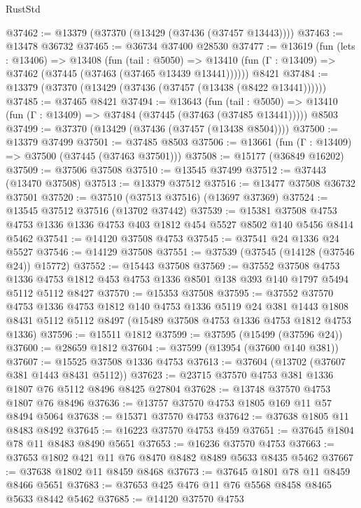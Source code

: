 \begin{lexlean}{RustStd}
\begin{coremodule}
@37462 := @13379 (@37370 (@13429 (@37436 (@37457 @13443))))
@37463 := @13478 @36732
@37465 := @36734 @37400 @28530
@37477 := @13619
    (fun (lets : @13406) =>
    @13408
      (fun (tail : @5050) =>
      @13410 (fun (Γ : @13409) => @37462 (@37445 (@37463 (@37465 @13439 @13441))))))
    @8421
@37484 := @13379 (@37370 (@13429 (@37436 (@37457 (@13438 (@8422 @13441))))))
@37485 := @37465 @8421
@37494 := @13643
    (fun (tail : @5050) => @13410 (fun (Γ : @13409) => @37484 (@37445 (@37463 (@37485 @13441)))))
    @8503
@37499 := @37370 (@13429 (@37436 (@37457 (@13438 @8504))))
@37500 := @13379 @37499
@37501 := @37485 @8503
@37506 := @13661 (fun (Γ : @13409) => @37500 (@37445 (@37463 @37501)))
@37508 := @15177 (@36849 @16202)
@37509 := @37506 @37508
@37510 := @13545 @37499
@37512 := @37443 (@13470 @37508)
@37513 := @13379 @37512
@37516 := @13477 @37508 @36732 @37501
@37520 := @37510 (@37513 @37516) (@13697 @37369)
@37524 := @13545 @37512 @37516 (@13702 @37442)
@37539 := @15381
    @37508
    @4753
    @4753
    @1336
    @1336
    @4753
    @403
    @1812
    @454
    @5527
    @8502
    @140
    @5456
    @8414
    @5462
@37541 := @14120 @37508 @4753
@37545 := @37541 @24 @1336 @24 @5527
@37546 := @14129 @37508
@37551 := @37539 (@37545 (@14128 (@37546 @24)) @15772)
@37552 := @15443 @37508
@37569 := @37552
    @37508
    @4753
    @1336
    @4753
    @1812
    @453
    @4753
    @1336
    @8501
    @138
    @393
    @140
    @1797
    @5494
    @5112
    @5112
    @8427
@37570 := @15353 @37508
@37595 := @37552
    @37570
    @4753
    @1336
    @4753
    @1812
    @140
    @4753
    @1336
    @5119
    @24
    @381
    @1443
    @1808
    @8431
    @5112
    @5112
    @8497
    (@15489 @37508 @4753 @1336 @4753 @1812 @4753 @1336)
@37596 := @15511 @1812
@37599 := @37595 (@15499 (@37596 @24))
@37600 := @28659 @1812
@37604 := @37599 (@13954 (@37600 @140 @381))
@37607 := @15525 @37508 @1336 @4753
@37613 := @37604 (@13702 (@37607 @381 @1443 @8431 @5112))
@37623 := @23715 @37570 @4753 @381 @1336 @1807 @76 @5112 @8496 @8425 @27804
@37628 := @13748 @37570 @4753 @1807 @76 @8496
@37636 := @13757 @37570 @4753 @1805 @169 @11 @57 @8494 @5064
@37638 := @15371 @37570 @4753
@37642 := @37638 @1805 @11 @8483 @8492
@37645 := @16223 @37570 @4753 @459
@37651 := @37645 @1804 @78 @11 @8483 @8490 @5651
@37653 := @16236 @37570 @4753
@37663 := @37653 @1802 @421 @11 @76 @8470 @8482 @8489 @5633 @8435 @5462
@37667 := @37638 @1802 @11 @8459 @8468
@37673 := @37645 @1801 @78 @11 @8459 @8466 @5651
@37683 := @37653 @425 @476 @11 @76 @5568 @8458 @8465 @5633 @8442 @5462
@37685 := @14120 @37570 @4753

\end{coremodule}
\end{lexlean}
